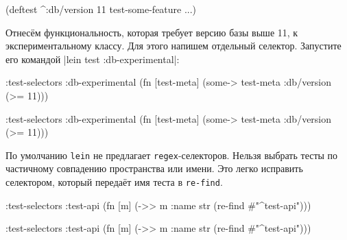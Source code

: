 \begin{english}
  \begin{clojure}
(deftest ^{:db/version 11}
  test-some-feature
  ...)
  \end{clojure}
\end{english}

Отнесём функциональность, которая требует версию базы выше 11, к
экспериментальному классу. Для этого напишем отдельный селектор. Запустите его
командой \spverb|lein test :db-experimental|:

\ifx\DEVICETYPE\MOBILE

\begin{english}
  \begin{clojure}
:test-selectors
  {:db-experimental
   (fn [test-meta]
     (some-> test-meta
             :db/version
             (>= 11)))}
  \end{clojure}
\end{english}

\else

\begin{english}
  \begin{clojure}
:test-selectors
  {:db-experimental
    (fn [test-meta]
      (some-> test-meta :db/version (>= 11)))}
  \end{clojure}
\end{english}

\fi

По умолчанию \verb|lein| не предлагает \verb|regex|-селекторов. Нельзя выбрать
тесты по частичному совпадению пространства или имени. Это легко исправить
селектором, который передаёт имя теста в \verb|re-find|.

\ifx\DEVICETYPE\MOBILE

\begin{english}
  \begin{clojure}
:test-selectors
  {:test-api
   (fn [m]
     (->> m :name str
          (re-find #"^test-api")))}
  \end{clojure}
\end{english}

\else

\begin{english}
  \begin{clojure}
:test-selectors
  {:test-api
    (fn [m] (->> m :name str
                 (re-find #"^test-api")))}
  \end{clojure}
\end{english}

\fi

